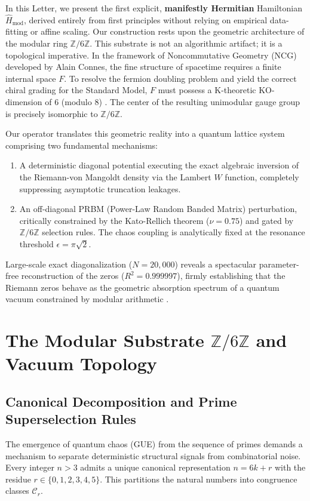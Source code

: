 \documentclass[prl,aps,floatfix,superscriptaddress,10pt]{revtex4-2}
\newcommand{\Zmod}{\mathbb{Z}/6\mathbb{Z}}
\begin{document}
In this Letter, we present the first explicit, \textbf{manifestly Hermitian} Hamiltonian $\hat{H}_{\text{mod}}$, derived entirely from first principles without relying on empirical data-fitting or affine scaling. Our construction rests upon the geometric architecture of the modular ring $\mathbb{Z}/6\mathbb{Z}$. This substrate is not an algorithmic artifact; it is a topological imperative. In the framework of Noncommutative Geometry (NCG) developed by Alain Connes, the fine structure of spacetime requires a finite internal space $F$. To resolve the fermion doubling problem and yield the correct chiral grading for the Standard Model, $F$ must possess a K-theoretic KO-dimension of 6 (modulo 8) \cite{Connes2008, Chamseddine2007, ConnesConsani2021}. The center of the resulting unimodular gauge group is precisely isomorphic to $\Zmod$.


Our operator translates this geometric reality into a quantum lattice system comprising two fundamental mechanisms:
\begin{enumerate}
    \item A deterministic diagonal potential executing the exact algebraic inversion of the Riemann-von Mangoldt density via the Lambert $W$ function, completely suppressing asymptotic truncation leakages.
    \item An off-diagonal PRBM (Power-Law Random Banded Matrix) perturbation, critically constrained by the Kato-Rellich theorem ($\nu = 0.75$) and gated by $\Zmod$ selection rules. The chaos coupling is analytically fixed at the resonance threshold $\epsilon = \pi\sqrt{2}$.
\end{enumerate}
Large-scale exact diagonalization ($N=20,000$) reveals a spectacular parameter-free reconstruction of the zeros ($R^2 = 0.999997$), firmly establishing that the Riemann zeros behave as the geometric absorption spectrum of a quantum vacuum constrained by modular arithmetic \cite{Connes1999}.


\section{The Modular Substrate \texorpdfstring{$\mathbb{Z}/6\mathbb{Z}$}{Z/6Z} and Vacuum Topology}

\subsection{Canonical Decomposition and Prime Superselection Rules}

The emergence of quantum chaos (GUE) from the sequence of primes demands a mechanism to separate deterministic structural signals from combinatorial noise. Every integer $n > 3$ admits a unique canonical representation $n = 6k + r$ with the residue $r \in \{0,1,2,3,4,5\}$. This partitions the natural numbers into congruence classes $\mathcal{C}_r$. 
\end{document}

